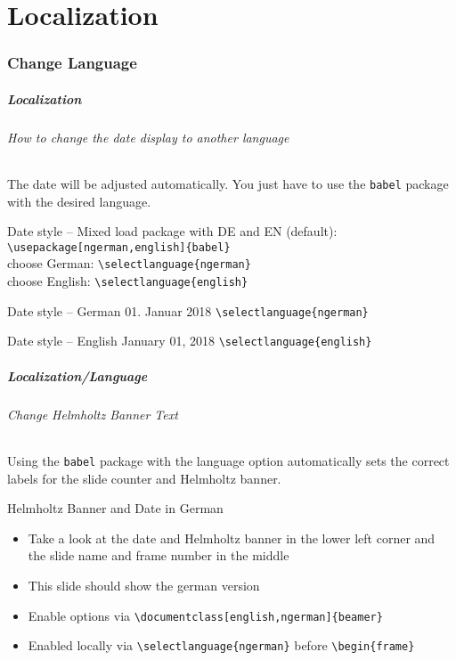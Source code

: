 %
\part{Localization}
\makepart
\section{Change Language}
\begin{frame}[fragile,label=localization]
        \frametitle{Localization}
        \framesubtitle{How to change the date display to another language}
        The date will be adjusted automatically. You just have to use the {\tt babel}
        package with the desired language.
        \begin{block}{Date style -- Mixed}
                load package with DE and EN (default): \hfill \verb+\usepackage[ngerman,english]{babel}+\\
                choose German: \hfill \verb+\selectlanguage{ngerman}+\\
                choose English: \hfill \verb+\selectlanguage{english}+
        \end{block}
        \begin{block}{Date style -- German}
                01. Januar 2018 \hfill
                \verb+\selectlanguage{ngerman}+
        \end{block}
        \begin{block}{Date style -- English}
                January 01, 2018 \hfill
                \verb+\selectlanguage{english}+
        \end{block}

\end{frame}

\begin{frame}[fragile,,label=translation]
        \frametitle{Localization/Language}
        \framesubtitle{Change Helmholtz Banner Text}
        Using the \texttt{babel} package with the language option automatically sets
        the correct labels for the slide counter and Helmholtz banner.

        \begin{block}{Helmholtz Banner and Date in German}
        \begin{itemize}
          \item Take a look at the date and Helmholtz banner in the lower left
          corner and the slide name and frame number in the middle
          \item This slide should show the german version
          \item Enable options via \verb+\documentclass[english,ngerman]{beamer}+
          \item Enabled locally via \verb+\selectlanguage{ngerman}+ before
          \verb+\begin{frame}+
        \end{itemize}
        \end{block}
\end{frame}

\author{Your Name}
